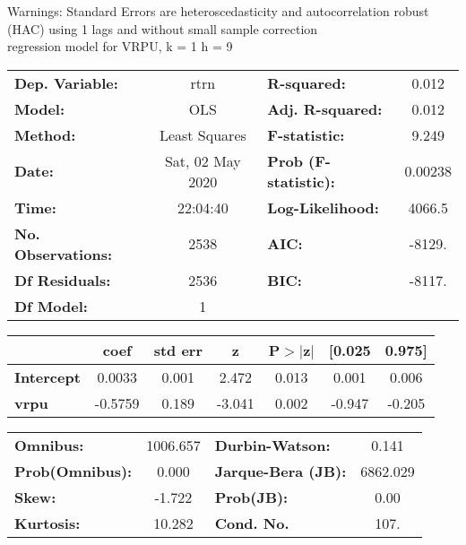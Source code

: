 Warnings: \newline
 [1] Standard Errors are heteroscedasticity and autocorrelation robust (HAC) using 1 lags and without small sample correction\\ 

regression model for VRPU, k = 1 h = 9\begin{center}
\begin{tabular}{lclc}
\toprule
\textbf{Dep. Variable:}    &       rtrn       & \textbf{  R-squared:         } &     0.012   \\
\textbf{Model:}            &       OLS        & \textbf{  Adj. R-squared:    } &     0.012   \\
\textbf{Method:}           &  Least Squares   & \textbf{  F-statistic:       } &     9.249   \\
\textbf{Date:}             & Sat, 02 May 2020 & \textbf{  Prob (F-statistic):} &  0.00238    \\
\textbf{Time:}             &     22:04:40     & \textbf{  Log-Likelihood:    } &    4066.5   \\
\textbf{No. Observations:} &        2538      & \textbf{  AIC:               } &    -8129.   \\
\textbf{Df Residuals:}     &        2536      & \textbf{  BIC:               } &    -8117.   \\
\textbf{Df Model:}         &           1      & \textbf{                     } &             \\
\bottomrule
\end{tabular}
\begin{tabular}{lcccccc}
                   & \textbf{coef} & \textbf{std err} & \textbf{z} & \textbf{P$> |$z$|$} & \textbf{[0.025} & \textbf{0.975]}  \\
\midrule
\textbf{Intercept} &       0.0033  &        0.001     &     2.472  &         0.013        &        0.001    &        0.006     \\
\textbf{vrpu}      &      -0.5759  &        0.189     &    -3.041  &         0.002        &       -0.947    &       -0.205     \\
\bottomrule
\end{tabular}
\begin{tabular}{lclc}
\textbf{Omnibus:}       & 1006.657 & \textbf{  Durbin-Watson:     } &    0.141  \\
\textbf{Prob(Omnibus):} &   0.000  & \textbf{  Jarque-Bera (JB):  } & 6862.029  \\
\textbf{Skew:}          &  -1.722  & \textbf{  Prob(JB):          } &     0.00  \\
\textbf{Kurtosis:}      &  10.282  & \textbf{  Cond. No.          } &     107.  \\
\bottomrule
\end{tabular}
\end{center}

